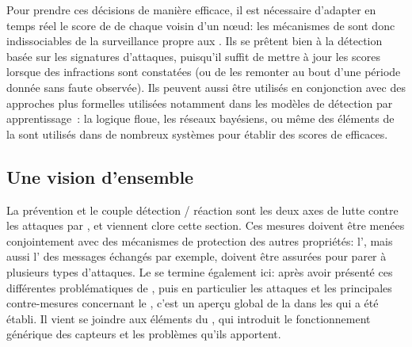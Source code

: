 Pour prendre ces décisions de manière efficace, il est nécessaire d'adapter en temps réel le score de \reput de chaque voisin d'un nœud: les mécanismes de  sont donc indissociables de la surveillance propre aux \IDS.
Ils se prêtent bien à la détection basée sur les signatures d'attaques, puisqu'il suffit de mettre à jour les scores lorsque des infractions sont constatées (ou de les remonter au bout d'une période donnée sans faute observée).
Ils peuvent aussi être utilisés en conjonction avec des approches plus formelles utilisées notamment dans les modèles de détection par apprentissage~\cite{F-GRL07,MC10}: la logique floue, les réseaux bayésiens, ou même des éléments de la  sont utilisés dans de nombreux systèmes pour établir des scores de  efficaces.

\subsection{Une vision d'ensemble}
La prévention et le couple détection / réaction sont les deux axes de lutte contre les attaques par \dds, et viennent clore cette section.
Ces mesures doivent être menées conjointement avec des mécanismes de protection des autres propriétés: l', mais aussi l' des messages échangés par exemple, doivent être assurées pour parer à plusieurs types d'attaques.
Le  se termine également ici: après avoir présenté ces différentes problématiques de \secu, puis en particulier les attaques et les principales contre-mesures concernant le \dds, c'est un aperçu global de la \secu dans les \rcs qui a été établi.
Il vient se joindre aux éléments du , qui introduit le fonctionnement générique des capteurs et les problèmes qu'ils apportent.

